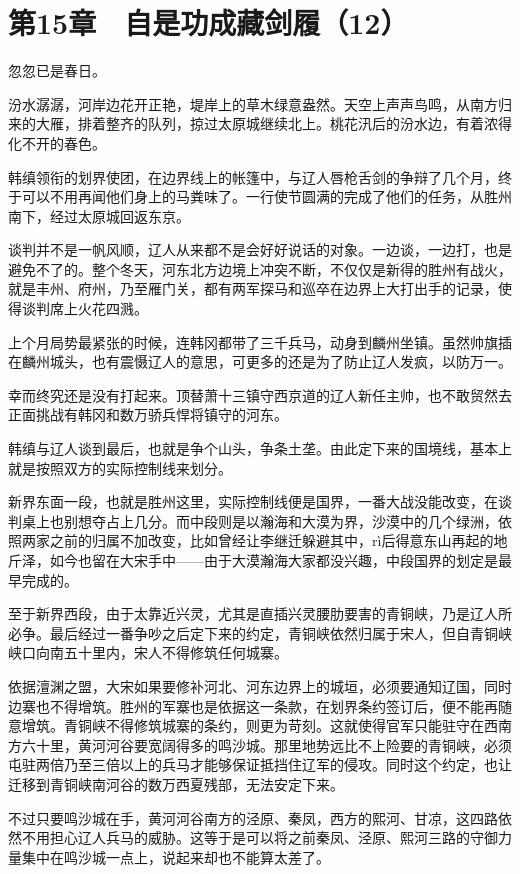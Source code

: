 \section{第15章　自是功成藏剑履（12）}

忽忽已是春日。

汾水潺潺，河岸边花开正艳，堤岸上的草木绿意盎然。天空上声声鸟鸣，从南方归来的大雁，排着整齐的队列，掠过太原城继续北上。桃花汛后的汾水边，有着浓得化不开的春色。

韩缜领衔的划界使团，在边界线上的帐篷中，与辽人唇枪舌剑的争辩了几个月，终于可以不用再闻他们身上的马粪味了。一行使节圆满的完成了他们的任务，从胜州南下，经过太原城回返东京。

谈判并不是一帆风顺，辽人从来都不是会好好说话的对象。一边谈，一边打，也是避免不了的。整个冬天，河东北方边境上冲突不断，不仅仅是新得的胜州有战火，就是丰州、府州，乃至雁门关，都有两军探马和巡卒在边界上大打出手的记录，使得谈判席上火花四溅。

上个月局势最紧张的时候，连韩冈都带了三千兵马，动身到麟州坐镇。虽然帅旗插在麟州城头，也有震慑辽人的意思，可更多的还是为了防止辽人发疯，以防万一。

幸而终究还是没有打起来。顶替萧十三镇守西京道的辽人新任主帅，也不敢贸然去正面挑战有韩冈和数万骄兵悍将镇守的河东。

韩缜与辽人谈到最后，也就是争个山头，争条土垄。由此定下来的国境线，基本上就是按照双方的实际控制线来划分。

新界东面一段，也就是胜州这里，实际控制线便是国界，一番大战没能改变，在谈判桌上也别想夺占上几分。而中段则是以瀚海和大漠为界，沙漠中的几个绿洲，依照两家之前的归属不加改变，比如曾经让李继迁躲避其中，rì后得意东山再起的地斤泽，如今也留在大宋手中——由于大漠瀚海大家都没兴趣，中段国界的划定是最早完成的。

至于新界西段，由于太靠近兴灵，尤其是直插兴灵腰肋要害的青铜峡，乃是辽人所必争。最后经过一番争吵之后定下来的约定，青铜峡依然归属于宋人，但自青铜峡峡口向南五十里内，宋人不得修筑任何城寨。

依据澶渊之盟，大宋如果要修补河北、河东边界上的城垣，必须要通知辽国，同时边寨也不得增筑。胜州的军寨也是依据这一条款，在划界条约签订后，便不能再随意增筑。青铜峡不得修筑城寨的条约，则更为苛刻。这就使得官军只能驻守在西南方六十里，黄河河谷要宽阔得多的鸣沙城。那里地势远比不上险要的青铜峡，必须屯驻两倍乃至三倍以上的兵马才能够保证抵挡住辽军的侵攻。同时这个约定，也让迁移到青铜峡南河谷的数万西夏残部，无法安定下来。

不过只要鸣沙城在手，黄河河谷南方的泾原、秦凤，西方的熙河、甘凉，这四路依然不用担心辽人兵马的威胁。这等于是可以将之前秦凤、泾原、熙河三路的守御力量集中在鸣沙城一点上，说起来却也不能算太差了。

